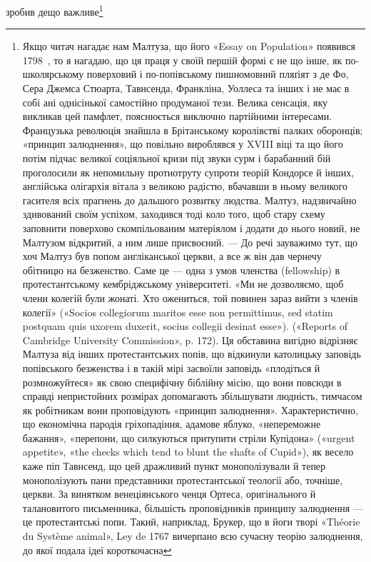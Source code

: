 зробив дещо важливе\footnote{
Якщо читач нагадає нам Малтуза, що його «Essay on Population»
появився 1798~, то я нагадаю, що ця праця у своїй першій формі є не
що інше, як по-школярському поверховий і по-попівському пишномовний
пляґіят з де Фо, Сера Джемса Стюарта, Тавнсенда, Франкліна, Уоллеса
та інших і не має в собі ані однісінької самостійно продуманої тези. Велика
сенсація, яку викликав цей памфлет, пояснюється виключно партійними
інтересами. Французька революція знайшла в Брітанському королівстві
палких оборонців; «принцип залюднення», що повільно вироблявся у
XVIII віці та що його потім підчас великої соціяльної кризи під звуки
сурм і барабанний бій проголосили як непомильну протиотруту супроти
теорій Кондорсе й інших, англійська олігархія вітала з великою радістю,
вбачавши в ньому великого гасителя всіх прагнень до дальшого розвитку
людства. Малтуз, надзвичайно здивований своїм успіхом, заходився тоді
коло того, щоб стару схему заповнити поверхово скомпільованим матеріялом
і додати до нього новий, не Малтузом відкритий, а ним лише
присвоєний. — До речі зауважимо тут, що хоч Малтуз був попом англіканської
церкви, а все ж він дав чернечу обітницю на безженство.
Саме це — одна з умов членства (fellowship) в протестантському кембріджському
університеті. «Ми не дозволяємо, щоб члени колегій були
жонаті. Хто ожениться, той повинен зараз вийти з членів колегії» («Socios
collegiorum maritos esse non permittimus, sed statim postquam quis
uxorem duxerit, socius collegii desinat esse»). («Reports of Cambridge University
Commission», p. 172). Ця обставина вигідно відрізняє Малтуза
від інших протестантських попів, що відкинули католицьку заповідь
попівського безженства і в такій мірі засвоїли заповідь «плодіться й
розмножуйтеся» як свою специфічну біблійну місію, що вони повсюди
в справді непристойних розмірах допомагають збільшувати людність,
тимчасом як робітникам вони проповідують «принцип залюднення».
Характеристично, що економічна пародія гріхопадіння, адамове яблуко,
«непереможне бажання», «перепони, що силкуються притупити стріли
Купідона» («urgent appetite», «the checks which tend to blunt the shafts
of Cupid»), як весело каже піп Тавнсенд, що цей дражливий пункт монополізували
й тепер монополізують пани представники протестантської
теології або, точніше, церкви. За винятком венеціянського ченця Ортеса,
оригінального й талановитого письменника, більшість проповідників
принципу залюднення — це протестантські попи. Такий, наприклад,
Брукер, що в йоги творі «Théorie du Système animal», Ley de 1767 вичерпано
всю сучасну теорію залюднення, до якої подала ідеї короткочасна
}
